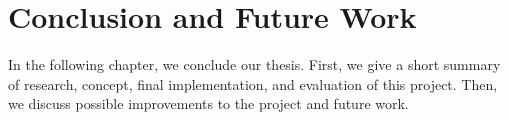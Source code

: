 \chapter{Conclusion and Future Work}
In the following chapter, we conclude our thesis. First, we give a short summary of research, concept, final implementation, and evaluation of this project. Then, we discuss possible improvements to the project and future work. 



